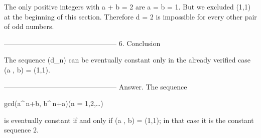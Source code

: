 The only positive integers with a + b = 2 are a = b = 1.
But we excluded (1,1) at the beginning of this section.
Therefore d = 2 is impossible for every other pair of odd numbers.

------------------------------------------------
6.  Conclusion

The sequence (d_n) can be eventually constant only in the already
verified case (a , b) = (1,1).

------------------------------------------------
Answer.  
The sequence  

gcd(a^{\,n}+b,\; b^{\,n}+a)\;(n = 1,2,\dots)

is eventually constant if and only if (a , b) = (1,1); in that case it
is the constant sequence 2.